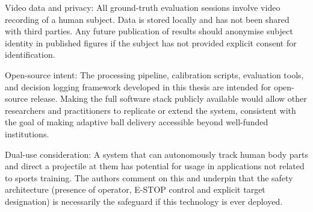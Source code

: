 Video data and privacy: All ground-truth evaluation sessions involve video recording of a human subject. Data is stored locally and has not been shared with third parties. Any future publication of results should anonymise subject identity in published figures if the subject has not provided explicit consent for identification.

Open-source intent: The processing pipeline, calibration scripts, evaluation tools, and decision logging framework developed in this thesis are intended for open-source release. Making the full software stack publicly available would allow other researchers and practitioners to replicate or extend the system, consistent with the goal of making adaptive ball delivery accessible beyond well-funded institutions.

Dual-use consideration: A system that can autonomously track human body parts and direct a projectile at them has potential for usage in applications not related to sports training. The authors comment on this and underpin that the safety architecture (presence of operator, E-STOP control and explicit target designation) is necessarily the safeguard if this technology is ever deployed.

